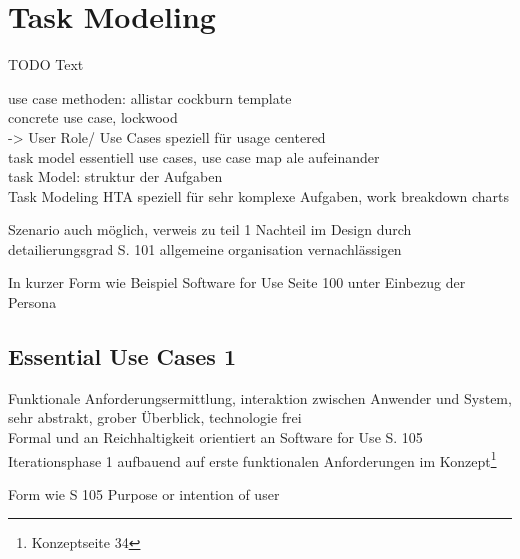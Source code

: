 
\section{Task Modeling}
TODO
Text

use case methoden: allistar cockburn template \\
concrete use case, lockwood\\


-> User Role/ Use Cases speziell für usage centered	\\
task model essentiell use cases, use case map ale aufeinander\\

task Model: struktur der Aufgaben\\

Task Modeling HTA speziell für sehr komplexe Aufgaben, work breakdown charts

Szenario auch möglich, verweis zu teil 1
Nachteil im Design durch detailierungsgrad S. 101 allgemeine organisation vernachlässigen

In kurzer Form wie Beispiel Software for Use Seite 100 unter Einbezug der Persona

\newpage

\subsection{Essential Use Cases 1 }
Funktionale Anforderungsermittlung, interaktion zwischen Anwender und System, sehr abstrakt, grober Überblick, technologie frei\\
Formal und an Reichhaltigkeit orientiert an Software for Use S. 105
Iterationsphase 1 aufbauend auf erste funktionalen Anforderungen im Konzept\footnote{Konzeptseite 34}

Form wie S 105 Purpose or intention of user

